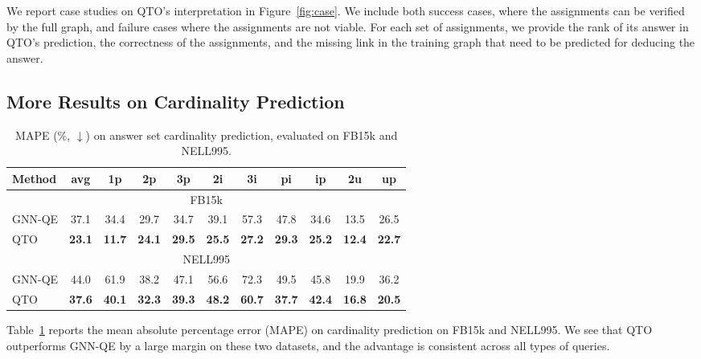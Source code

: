 We report case studies on QTO's interpretation in Figure~\ref{fig:case}. We include both success cases, where the assignments can be verified by the full graph, and failure cases where the assignments are not viable.
For each set of assignments, we provide the rank of its answer in QTO's prediction, the correctness of the assignments, and the missing link in the training graph that need to be predicted for deducing the answer.

\subsection{More Results on Cardinality Prediction}
\label{app:card}

\begin{table}[!h]
    \centering
    \begin{tabular}{lcccccccccc}
        \toprule
        \bf{Method} & \bf{avg} & \bf{1p} & \bf{2p} & \bf{3p} & \bf{2i} & \bf{3i} & \bf{pi} & \bf{ip} & \bf{2u} & \bf{up} \\
        \midrule
        \multicolumn{11}{c}{FB15k} \\
        \midrule
        GNN-QE & 37.1 & 34.4 & 29.7 & 34.7 & 39.1 & 57.3 & 47.8 & 34.6 & 13.5 & 26.5 \\
        QTO & \bf{23.1} & \bf{11.7} & \bf{24.1} & \bf{29.5} & \bf{25.5} & \bf{27.2} & \bf{29.3} & \bf{25.2} & \bf{12.4} & \bf{22.7} \\
        \midrule
        \multicolumn{11}{c}{NELL995} \\
        \midrule
        GNN-QE & 44.0 & 61.9 & 38.2 & 47.1 & 56.6 & 72.3 & 49.5 & 45.8 & 19.9 & 36.2 \\
        QTO & \bf{37.6} & \bf{40.1} & \bf{32.3} & \bf{39.3} & \bf{48.2} & \bf{60.7} & \bf{37.7} & \bf{42.4} & \bf{16.8} & \bf{20.5} \\
        \bottomrule
    \end{tabular}
    \caption{MAPE (\%, $\downarrow$) on answer set cardinality prediction, evaluated on FB15k and NELL995.}
    \label{tb:mape1}
\end{table}

Table~\ref{tb:mape1} reports the mean absolute percentage error (MAPE) on cardinality prediction on FB15k and NELL995.
We see that QTO outperforms GNN-QE by a large margin on these two datasets, and the advantage is consistent across all types of queries.